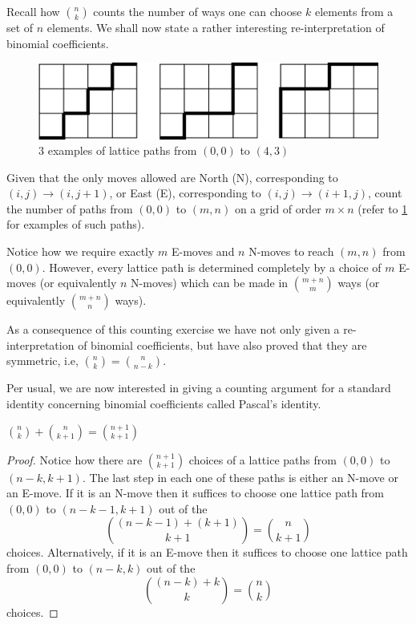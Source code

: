 Recall how $\binom{n}{k}$ counts the number of ways one can choose $k$ elements from a set of $n$ elements. We shall now state a rather interesting re-interpretation of binomial coefficients. 
\begin{figure}[H]
	\centering
	\includegraphics[scale=0.6]{Images/Figure8.png}
	\caption{$3$ examples of lattice paths from $\left( 0,0 \right)$ to $\left( 4,3 \right) $}
	\label{f:1.8}
\end{figure}
\begin{question}
Given that the only moves allowed are North (N), corresponding to $\left( i,j \right) \to \left( i,j+1 \right)$, or East (E), corresponding to $\left( i,j \right)\to \left( i+1,j \right)$, count the number of paths from $\left( 0,0 \right)$ to $\left( m,n \right)$ on a grid of order $m\times n$ (refer to \cref{f:1.8} for examples of such paths).
\end{question}
\begin{solution}
Notice how we require exactly $m$ E-moves and $n$ N-moves to reach $\left( m,n \right)$ from $\left( 0,0 \right)$. However, every lattice path is determined completely by a choice of $m$ E-moves (or equivalently $n$ N-moves) which can be made in $\binom{m+n}{m}$ ways (or equivalently $\binom{m+n}{n}$ ways).
\end{solution}
\begin{remark}
As a consequence of this counting exercise we have not only given a re-interpretation of binomial coefficients, but have also proved that they are symmetric, i.e, $\binom{n}{k}=\binom{n}{n-k}$.
\label{r:1.2}
\end{remark}
Per usual, we are now interested in giving a counting argument for a standard identity concerning binomial coefficients called Pascal's identity.
\begin{claim}
$\binom{n}{k} + \binom{n}{k+1} = \binom{n+1}{k+1}$
\label{c:1.3}
\end{claim}
\begin{proof}
Notice how there are $\binom{n+1}{k+1}$ choices of a lattice paths from $\left( 0,0 \right)$ to $\left( n-k,k+1 \right)$. The last step in each one of these paths is either an N-move or an E-move. If it is an N-move then it suffices to choose one lattice path from $\left( 0,0 \right)$ to $\left( n-k-1,k+1 \right)$ out of the \[
\binom{\left( n-k-1 \right) + \left( k+1 \right)}{k+1} = \binom{n}{k+1}
\] choices. Alternatively, if it is an E-move then it suffices to choose one lattice path from $\left( 0,0 \right)$ to $\left( n-k,k \right)$ out of the \[
\binom{\left( n-k \right) + k}{k} = \binom{n}{k}\] choices.
\end{proof}
